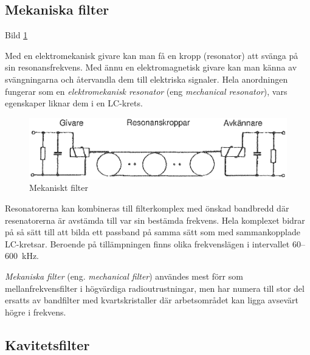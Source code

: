 \subsection{Mekaniska filter}

Bild \ref{fig:BildII3-30}

Med en elektromekanisk givare kan man få en kropp (resonator) att svänga på sin
resonansfrekvens. Med ännu en elektromagnetisk givare kan man känna av
svängningarna och återvandla dem till elektriska signaler. Hela anordningen
fungerar som en \emph{elektromekanisk resonator} (eng
\emph{mechanical resonator}), vars egenskaper liknar dem i en LC-krets.

\begin{figure}
\includegraphics[width=\textwidth]{images/cropped_pdfs/bild_2_3-30.pdf}
\caption{Mekaniskt filter}
\label{fig:BildII3-30}
\end{figure}

Resonatorerna kan kombineras till filterkomplex med önskad bandbredd där
resenatorerna är avstämda till var sin bestämda frekvens. Hela komplexet bidrar
på så sätt till att bilda ett passband på samma sätt som med sammankopplade
LC-kretsar. Beroende på tillämpningen finns olika frekvenslägen i intervallet
60--600~kHz.

\emph{Mekaniska filter} (eng. \emph{mechanical filter}) användes mest förr som
mellanfrekvensfilter i högvärdiga radioutrustningar, men har numera till stor
del ersatts av bandfilter med kvartskristaller där arbetsområdet kan ligga
avsevärt högre i frekvens.

\subsection{Kavitetsfilter}

